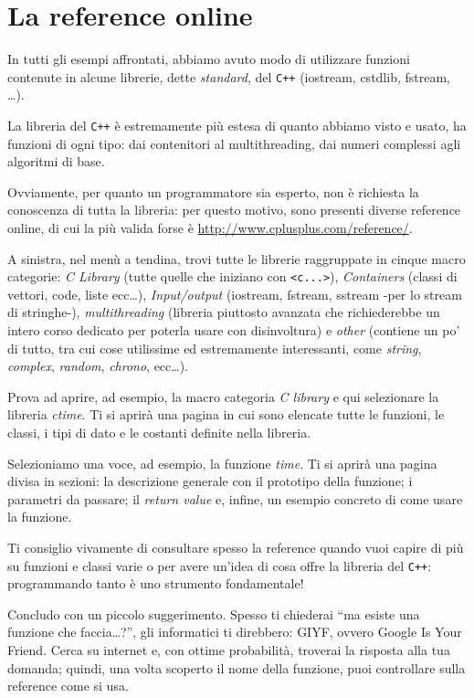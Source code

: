 \chapter{La reference online}
In tutti gli esempi affrontati, abbiamo avuto modo di utilizzare funzioni contenute in alcune librerie, dette \emph{standard}, del \verb|C++| (iostream, cstdlib, fstream, \ldots).

La libreria del \verb|C++| è estremamente più estesa di quanto abbiamo visto e usato, ha funzioni di ogni tipo: dai contenitori al multithreading, dai numeri complessi agli algoritmi di base.

Ovviamente, per quanto un programmatore sia esperto, non è richiesta la conoscenza di tutta la libreria: per questo motivo, sono presenti diverse reference online, di cui la più valida forse è \url{http://www.cplusplus.com/reference/}. 

A sinistra, nel menù a tendina, trovi tutte le librerie raggruppate in cinque macro categorie: \emph{C Library} (tutte quelle che iniziano con \verb|<c...>|), \emph{Containers} (classi di vettori, code, liste ecc\ldots), \emph{Input/output} (iostream, fstream, sstream -per lo stream di stringhe-), \emph{multithreading} (libreria piuttosto avanzata che richiederebbe un intero corso  dedicato per poterla usare con disinvoltura) e \emph{other} (contiene un po' di tutto, tra cui cose utilissime ed estremamente interessanti, come \emph{string}, \emph{complex}, \emph{random}, \emph{chrono}, ecc\ldots). 

Prova ad aprire, ad esempio, la macro categoria \emph{C library} e qui selezionare la libreria \emph{ctime}. Ti si aprirà una pagina in cui sono elencate tutte le funzioni, le classi, i tipi di dato e le costanti definite nella libreria. 

Selezioniamo una voce, ad esempio, la funzione \emph{time}. Ti si aprirà una pagina divisa in sezioni: la descrizione generale con il prototipo della funzione; i parametri da passare; il \emph{return value} e, infine, un esempio concreto di come usare la funzione. 

Ti consiglio vivamente di consultare spesso la reference quando vuoi capire di più su funzioni e classi varie o per avere un'idea di cosa offre la libreria del \verb|C++|: programmando tanto è uno strumento fondamentale!

Concludo con un piccolo suggerimento. Spesso ti chiederai ``ma esiste una funzione che faccia\ldots?'', gli informatici ti direbbero: GIYF, ovvero Google Is Your Friend. Cerca su internet e, con ottime probabilità, troverai la risposta alla tua domanda; quindi, una volta scoperto il nome della funzione, puoi controllare sulla reference come si usa. 